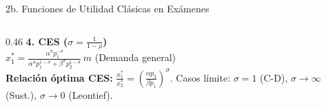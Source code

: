 \documentclass[aspectratio=169, 10pt]{beamer}
\begin{document}
\begin{frame}{2b. Funciones de Utilidad Clásicas en Exámenes}
\begin{columns}[T]
\begin{column}{0.46\textwidth}
      {\scriptsize\color{rojoAcento}\textbf{4. CES (\(\sigma = \frac{1}{1-\rho}\))}}\\[0pt]
      {\normalsize\color{rojoAcento}\textbf{\(x_1^* = \frac{\alpha^\sigma p_1^{-\sigma}}{\alpha^\sigma p_1^{1-\sigma} + \beta^\sigma p_2^{1-\sigma}}\,m\)}} \hfill {\tiny\color{grisTexto}(Demanda general)}\\[2pt]

      {\tiny\color{grisTexto}
        \textbf{Relación óptima CES:} \(\frac{x_1^*}{x_2^*} = \left(\frac{\alpha p_2}{\beta p_1}\right)^\sigma\). Casos límite: \(\sigma=1\) (C-D), \(\sigma\to\infty\) (Sust.), \(\sigma\to 0\) (Leontief).
      }
    \end{column}
  \end{columns}

\end{frame}
\end{document}
